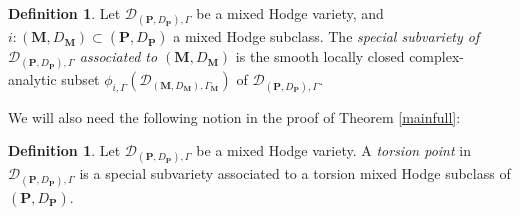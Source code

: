 \documentclass[10pt]{article}
\numberwithin{equation}{subsection}
\theoremstyle{plain}
\newtheorem{proposition}[theorem]{Proposition}
\newtheorem{corollary}[theorem]{Corollary}
\theoremstyle{definition}
\newtheorem{definition}[theorem]{Definition}
\theoremstyle{remark}
\newcommand{\Q}{\mathbb Q}
\newcommand{\pp}{\mathbf P}
\newcommand{\M}{\mathbf M}
\newcommand{\period}{\mathscr{D}}
\begin{document}
\begin{definition}
Let $\period_{(\pp, D_\pp), \Gamma}$ be a mixed Hodge variety, and $i : (\M,D_\M) \subset (\pp, D_\pp)$ a mixed Hodge subclass. The \textit{special subvariety of $\period_{(\pp, D_\pp), \Gamma}$ associated to $(\M,D_\M)$} is the smooth locally closed complex-analytic subset $\phi_{i, \Gamma}(\period_{(\M,D_\M), \Gamma_\M}) $ of $\period_{(\pp, D_\pp), \Gamma}$.
\end{definition}
We will also need the following notion in the proof of Theorem \ref{mainfull}:
\begin{definition}
Let $\period_{(\pp, D_\pp), \Gamma}$ be a mixed Hodge variety. A \textit{torsion point} in $\period_{(\pp, D_\pp), \Gamma}$ is a special subvariety associated to a torsion mixed Hodge subclass of $(\pp, D_\pp)$.
\end{definition}
\end{document}
